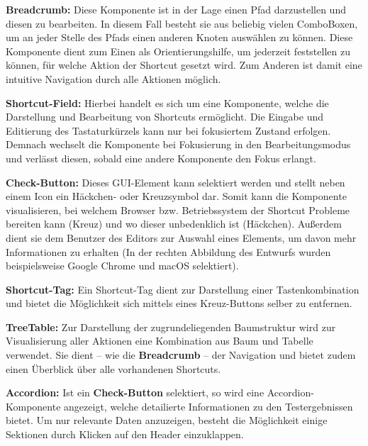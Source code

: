  \textbf{Breadcrumb:} Diese Komponente ist in der Lage einen Pfad darzustellen und diesen zu bearbeiten. In diesem Fall besteht sie aus beliebig vielen ComboBoxen, um an jeder Stelle des Pfads einen anderen Knoten auswählen zu können. Diese Komponente dient zum Einen als Orientierungshilfe, um jederzeit feststellen zu können, für welche Aktion der Shortcut gesetzt wird. Zum Anderen ist damit eine intuitive Navigation durch alle Aktionen möglich.

 \textbf{Shortcut-Field:} Hierbei handelt es sich um eine Komponente, welche die Darstellung und Bearbeitung von Shortcuts ermöglicht. Die Eingabe und Editierung des Tastaturkürzels kann nur bei fokusiertem Zustand erfolgen. Demnach wechselt die Komponente bei Fokusierung in den Bearbeitungsmodus und verlässt diesen, sobald eine andere Komponente den Fokus erlangt.

 \textbf{Check-Button:} Dieses GUI-Element kann selektiert werden und stellt neben einem Icon ein Häckchen- oder Kreuzsymbol dar. Somit kann die Komponente visualisieren, bei welchem Browser bzw. Betriebssystem der Shortcut Probleme bereiten kann (Kreuz) und wo dieser unbedenklich ist (Häckchen). Außerdem dient sie dem Benutzer des Editors zur Auswahl eines Elements, um davon mehr Informationen zu erhalten (In der rechten Abbildung des Entwurfs wurden beispielsweise Google Chrome und macOS selektiert).

 \textbf{Shortcut-Tag:} Ein Shortcut-Tag dient zur Darstellung einer Tastenkombination und bietet die Möglichkeit sich mittels eines Kreuz-Buttons selber zu entfernen.

 \textbf{TreeTable:} Zur Darstellung der zugrundeliegenden Baumstruktur wird zur Visualisierung aller Aktionen eine Kombination aus Baum und Tabelle verwendet. Sie dient -- wie die \textbf{Breadcrumb} -- der Navigation und bietet zudem einen Überblick über alle vorhandenen Shortcuts.

 \textbf{Accordion:} Ist ein \textbf{Check-Button} selektiert, so wird eine Accordion-Komponente angezeigt, welche detailierte Informationen zu den Testergebnissen bietet. Um nur relevante Daten anzuzeigen, besteht die Möglichkeit einige Sektionen durch Klicken auf den Header einzuklappen.

\vfill

